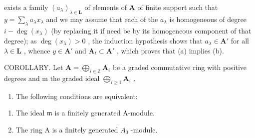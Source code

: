exists a family \((a_{\lambda})_{\lambda \in \mathbf{L}}\) of elements of \(\mathbf{A}\) of finite support such that \(y = \sum_{\lambda} a_{\lambda} x_{\lambda}\) and we may assume that each of the \(a_{\lambda}\) is homogeneous of degree \(i - \deg(x_{\lambda})\) (by replacing it if need be by its homogeneous component of that degree); as \(\deg(x_{\lambda}) > 0\) , the induction hypothesis shows that \(a_{\lambda} \in \mathbf{A}'\) for all \(\lambda \in \mathbf{L}\) , whence \(y \in \mathbf{A}'\) and \(\mathbf{A}_t \subset \mathbf{A}'\) , which proves that (a) implies (b).

COROLLARY. Let \(\mathbf{A} = \bigoplus_{i\in \mathbb{Z}}\mathbf{A}_i\) be a graded commutative ring with positive degrees and m the graded ideal \(\bigoplus_{i\geqslant 1}\mathbf{A}_i\) .

\begin{enumerate}
\def\labelenumi{(\roman{enumi})}
\tightlist
\item
  The following conditions are equivalent:
\end{enumerate}

\begin{enumerate}
\def\labelenumi{(\alph{enumi})}
\item
  The ideal \(\mathfrak{m}\) is a finitely generated A-module.
\item
  The ring A is a finitely generated \(A_{0}\) -module.
\end{enumerate}

